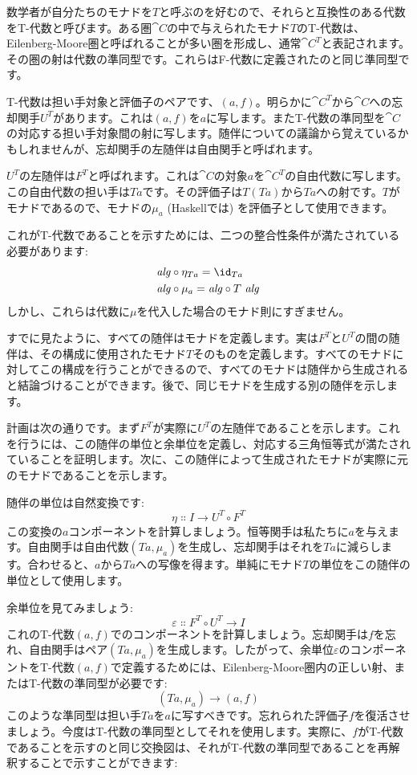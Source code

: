 数学者が自分たちのモナドを$T$と呼ぶのを好むので、それらと互換性のある代数をT-代数と呼びます。ある圏$\cat{C}$の中で与えられたモナド$T$のT-代数は、Eilenberg-Moore圏と呼ばれることが多い圏を形成し、通常$\cat{C}^T$と表記されます。その圏の射は代数の準同型です。これらはF-代数に定義されたのと同じ準同型です。

T-代数は担い手対象と評価子のペアです、$(a, f)$。明らかに$\cat{C}^T$から$\cat{C}$への忘却関手$U^T$があります。これは$(a, f)$を$a$に写します。またT-代数の準同型を$\cat{C}$の対応する担い手対象間の射に写します。随伴についての議論から覚えているかもしれませんが、忘却関手の左随伴は自由関手と呼ばれます。

$U^T$の左随伴は$F^T$と呼ばれます。これは$\cat{C}$の対象$a$を$\cat{C}^T$の自由代数に写します。この自由代数の担い手は$T a$です。その評価子は$T (T a)$から$T a$への射です。$T$がモナドであるので、モナドの$\mu_a$ (Haskellでは) を評価子として使用できます。

これがT-代数であることを示すためには、二つの整合性条件が満たされている必要があります: 
\begin{align*}
  \mathit{alg} & \circ \eta_{Ta} = \id_{Ta}     \\
  \mathit{alg} & \circ \mu_a = \mathit{alg} \circ T\ \mathit{alg}
\end{align*}
しかし、これらは代数に$\mu$を代入した場合のモナド則にすぎません。

すでに見たように、すべての随伴はモナドを定義します。実は$F^T$と$U^T$の間の随伴は、その構成に使用されたモナド$T$そのものを定義します。すべてのモナドに対してこの構成を行うことができるので、すべてのモナドは随伴から生成されると結論づけることができます。後で、同じモナドを生成する別の随伴を示します。

計画は次の通りです。まず$F^T$が実際に$U^T$の左随伴であることを示します。これを行うには、この随伴の単位と余単位を定義し、対応する三角恒等式が満たされていることを証明します。次に、この随伴によって生成されたモナドが実際に元のモナドであることを示します。

随伴の単位は自然変換です: 
\[\eta \Colon I \to U^T \circ F^T\]
この変換の$a$コンポーネントを計算しましょう。恒等関手は私たちに$a$を与えます。自由関手は自由代数$(T a, \mu_a)$を生成し、忘却関手はそれを$T a$に減らします。合わせると、$a$から$T a$への写像を得ます。単純にモナド$T$の単位をこの随伴の単位として使用します。

余単位を見てみましょう: 
\[\varepsilon \Colon F^T \circ U^T \to I\]
これのT-代数$(a, f)$でのコンポーネントを計算しましょう。忘却関手は$f$を忘れ、自由関手はペア$(T a, \mu_a)$を生成します。したがって、余単位$\varepsilon$のコンポーネントをT-代数$(a, f)$で定義するためには、Eilenberg-Moore圏内の正しい射、またはT-代数の準同型が必要です: 
\[(T a, \mu_a) \to (a, f)\]
このような準同型は担い手$T a$を$a$に写すべきです。忘れられた評価子$f$を復活させましょう。今度はT-代数の準同型としてそれを使用します。実際に、$f$がT-代数であることを示すのと同じ交換図は、それがT-代数の準同型であることを再解釈することで示すことができます: 

